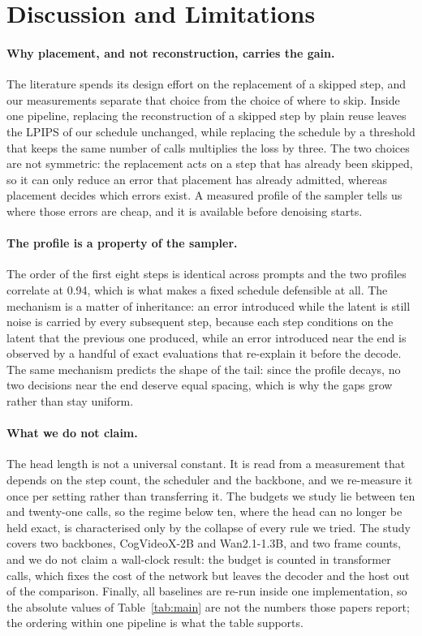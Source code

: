 \section{Discussion and Limitations}
\label{sec:discussion}

\paragraph{Why placement, and not reconstruction, carries the gain.} The literature spends its design effort on the replacement of a skipped step, and our measurements separate that choice from the choice of where to skip. Inside one pipeline, replacing the reconstruction of a skipped step by plain reuse leaves the LPIPS of our schedule unchanged, while replacing the schedule by a threshold that keeps the same number of calls multiplies the loss by three. The two choices are not symmetric: the replacement acts on a step that has already been skipped, so it can only reduce an error that placement has already admitted, whereas placement decides which errors exist. A measured profile of the sampler tells us where those errors are cheap, and it is available before denoising starts.

\paragraph{The profile is a property of the sampler.} The order of the first eight steps is identical across prompts and the two profiles correlate at 0.94, which is what makes a fixed schedule defensible at all. The mechanism is a matter of inheritance: an error introduced while the latent is still noise is carried by every subsequent step, because each step conditions on the latent that the previous one produced, while an error introduced near the end is observed by a handful of exact evaluations that re-explain it before the decode. The same mechanism predicts the shape of the tail: since the profile decays, no two decisions near the end deserve equal spacing, which is why the gaps grow rather than stay uniform.

\paragraph{What we do not claim.} The head length is not a universal constant. It is read from a measurement that depends on the step count, the scheduler and the backbone, and we re-measure it once per setting rather than transferring it. The budgets we study lie between ten and twenty-one calls, so the regime below ten, where the head can no longer be held exact, is characterised only by the collapse of every rule we tried. The study covers two backbones, CogVideoX-2B and Wan2.1-1.3B, and two frame counts, and we do not claim a wall-clock result: the budget is counted in transformer calls, which fixes the cost of the network but leaves the decoder and the host out of the comparison. Finally, all baselines are re-run inside one implementation, so the absolute values of Table~\ref{tab:main} are not the numbers those papers report; the ordering within one pipeline is what the table supports.
